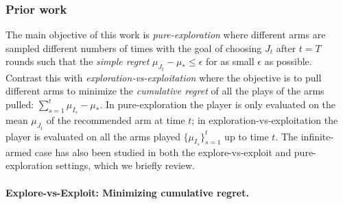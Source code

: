 


\subsubsection{Prior work}\label{prior_work}

The main objective of this work is \emph{pure-exploration} where different arms are sampled different numbers of times with the goal of choosing $J_t$ after $t=T$ rounds such that the \emph{simple regret} $\mu_{J_t}-\mu_* \leq \epsilon$ for as small $\epsilon$ as possible. 
Contrast this with \emph{exploration-vs-exploitation} where the objective is to pull different arms to minimize the \emph{cumulative regret} of all the plays of the arms pulled: $\sum_{s=1}^t \mu_{I_s} - \mu_*$.
In pure-exploration the player is only evaluated on the mean $\mu_{J_t}$ of the recommended arm at time $t$; in exploration-vs-exploitation the player is evaluated on all the arms played $\{ \mu_{I_s} \}_{s=1}^t$ up to time $t$. 
The infinite-armed case has also been studied in both the explore-vs-exploit and pure-exploration settings, which we briefly review. 


\paragraph{Explore-vs-Exploit: Minimizing cumulative regret.} 

